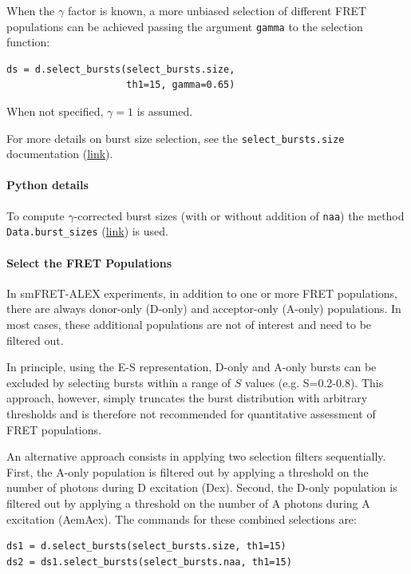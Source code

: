 \documentclass[10pt,letterpaper]{article}
\begin{document}
When the $\gamma$ factor is known, a more unbiased selection of different FRET
populations can be achieved passing the argument \verb|gamma| to the 
selection function:

\begin{lstlisting}
ds = d.select_bursts(select_bursts.size,
                     th1=15, gamma=0.65)
\end{lstlisting}

When not specified, $\gamma=1$ is assumed.

For more details on burst size selection, see the
\verb|select_bursts.size| documentation
(\href{http://fretbursts.readthedocs.org/en/latest/burst_selection.html#fretbursts.select_bursts.size}{link}).

\paragraph{Python details} 
To compute $\gamma$-corrected burst sizes (with or without addition of \verb|naa|) 
the method \verb|Data.burst_sizes|
(\href{http://fretbursts.readthedocs.org/en/latest/data_class.html#fretbursts.burstlib.Data.burst_sizes}{link})
is used.

\paragraph{Select the FRET Populations}

In smFRET-ALEX experiments, in addition to one or more FRET populations, there are always
donor-only (D-only) and acceptor-only (A-only) populations.
In most cases, these additional populations are not of interest and need to be filtered out.

In principle, using the E-S representation, D-only and A-only bursts
can be excluded by selecting bursts within a range of $S$ values (e.g. S=0.2-0.8). 
This approach, however, simply truncates the burst distribution with arbitrary
thresholds and is therefore not recommended for quantitative assessment of FRET
populations.

An alternative approach consists in applying two selection filters sequentially.
First, the A-only population is filtered out
by applying a threshold on the number of photons during D excitation (Dex).
Second, the D-only population is filtered out by applying a threshold on 
the number of A photons during A excitation (AemAex).
The commands for these combined selections are:

\begin{lstlisting}
ds1 = d.select_bursts(select_bursts.size, th1=15)
ds2 = ds1.select_bursts(select_bursts.naa, th1=15)
\end{lstlisting}
\end{document}
